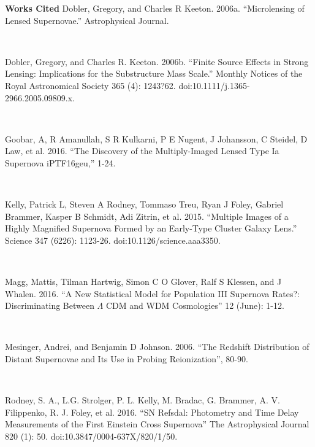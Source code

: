 \pagebreak



\textbf{Works Cited} 
Dobler,
Gregory, and Charles R Keeton. 2006a. ``Microlensing of Lensed
Supernovae.'' Astrophysical Journal.

\

Dobler, Gregory, and Charles R. Keeton. 2006b. ``Finite Source
Effects in Strong Lensing: Implications for the Substructure Mass
Scale.'' Monthly Notices of the Royal Astronomical Society 365 (4):
1243?62. doi:10.1111/j.1365-2966.2005.09809.x.

\

Goobar, A, R Amanullah, S R Kulkarni, P E Nugent, J Johansson, C
Steidel, D Law, et al. 2016. ``The Discovery of the Multiply-Imaged
Lensed Type Ia Supernova iPTF16geu,'' 1-24.

\

Kelly, Patrick L, Steven A Rodney, Tommaso Treu, Ryan J Foley,
Gabriel Brammer, Kasper B Schmidt, Adi Zitrin, et al. 2015. ``Multiple
Images of a Highly Magnified Supernova Formed by an Early-Type Cluster
Galaxy Lens.'' Science 347 (6226):
1123-26. doi:10.1126/science.aaa3350.

\

Magg, Mattis, Tilman Hartwig, Simon C O Glover, Ralf S Klessen, and
J Whalen. 2016. ``A New Statistical Model for Population III Supernova
Rates?: Discriminating Between $\Lambda$ CDM and WDM Cosmologies'' 12
(June): 1-12.

\

Mesinger, Andrei, and Benjamin D Johnson. 2006. ``The Redshift
Distribution of Distant Supernovae and Its Use in Probing
Reionization'', 80-90.

\

Rodney, S. A., L.G. Strolger, P. L. Kelly, M. Bradac, G. Brammer,
A. V. Filippenko, R. J. Foley, et al. 2016. ``SN Refsdal: Photometry
and Time Delay Measurements of the First Einstein Cross Supernova''
The Astrophysical Journal 820 (1):
50. doi:10.3847/0004-637X/820/1/50.







